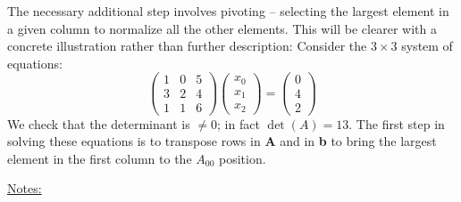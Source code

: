 The necessary additional step involves pivoting -- selecting the
largest element in a given column to normalize all the other
elements. This will be clearer with a concrete illustration rather
than further description: Consider the $3 \times 3$ system of equations:
\begin{equation}
    \label{eq:09_15}
    \begin{pmatrix}
    1 &0 &5\\ 
    3 &2 &4\\ 
    1 &1 &6
    \end{pmatrix}
\begin{pmatrix}
x_0\\
x_1\\
x_2
\end{pmatrix}
=
\begin{pmatrix}
    0\\
    4\\
    2
\end{pmatrix}
\end{equation}
We check that the determinant is $\neq0$; in fact $\det(A) = 13$. The first
step in solving these equations is to transpose rows in \textbf{A} and in \textbf{b}
to bring the largest element in the first column to the $A_{00}$ position.

\underline{Notes:}

